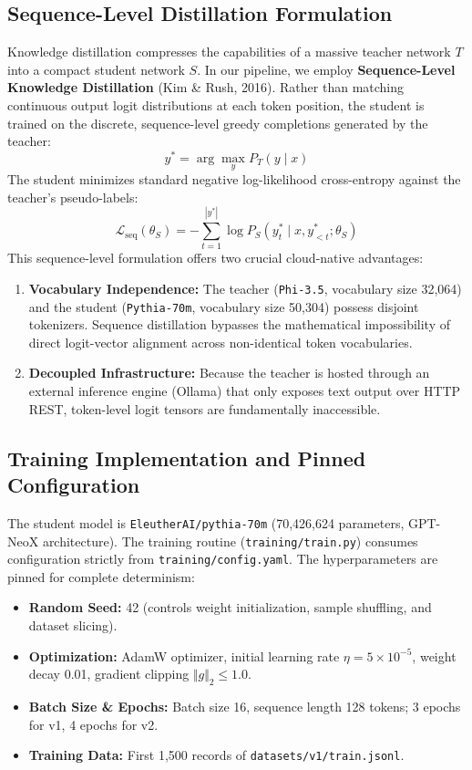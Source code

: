 \documentclass[10pt,a4paper]{article}
\begin{document}
\subsection{Sequence-Level Distillation Formulation}
Knowledge distillation compresses the capabilities of a massive teacher network $T$ into a compact student network $S$. In our pipeline, we employ \textbf{Sequence-Level Knowledge Distillation} (Kim \& Rush, 2016). Rather than matching continuous output logit distributions at each token position, the student is trained on the discrete, sequence-level greedy completions generated by the teacher:
$$y^* = \arg\max_y P_T(y \mid x)$$
The student minimizes standard negative log-likelihood cross-entropy against the teacher's pseudo-labels:
$$\mathcal{L}_{\text{seq}}(\theta_S) = -\sum_{t=1}^{|y^*|} \log P_S(y_t^* \mid x, y_{<t}^*; \theta_S)$$
This sequence-level formulation offers two crucial cloud-native advantages:
\begin{enumerate}[noitemsep,topsep=2pt,leftmargin=*]
    \item \textbf{Vocabulary Independence:} The teacher (\texttt{Phi-3.5}, vocabulary size 32,064) and the student (\texttt{Pythia-70m}, vocabulary size 50,304) possess disjoint tokenizers. Sequence distillation bypasses the mathematical impossibility of direct logit-vector alignment across non-identical token vocabularies.
    \item \textbf{Decoupled Infrastructure:} Because the teacher is hosted through an external inference engine (Ollama) that only exposes text output over HTTP REST, token-level logit tensors are fundamentally inaccessible.
\end{enumerate}

\subsection{Training Implementation and Pinned Configuration}
The student model is \texttt{EleutherAI/pythia-70m} (70,426,624 parameters, GPT-NeoX architecture). The training routine (\texttt{training/train.py}) consumes configuration strictly from \texttt{training/config.yaml}. The hyperparameters are pinned for complete determinism:
\begin{itemize}[noitemsep,topsep=2pt,leftmargin=*]
    \item \textbf{Random Seed:} 42 (controls weight initialization, sample shuffling, and dataset slicing).
    \item \textbf{Optimization:} AdamW optimizer, initial learning rate $\eta = 5 \times 10^{-5}$, weight decay 0.01, gradient clipping $\Vert g \Vert_2 \le 1.0$.
    \item \textbf{Batch Size \& Epochs:} Batch size 16, sequence length 128 tokens; 3 epochs for v1, 4 epochs for v2.
    \item \textbf{Training Data:} First 1,500 records of \texttt{datasets/v1/train.jsonl}.
\end{itemize}
\end{document}
